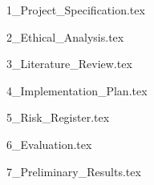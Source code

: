 \documentclass[a4paper, 11pt]{article}
\begin{document}


\tableofcontents

{1_Project_Specification.tex}

{2_Ethical_Analysis.tex}

{3_Literature_Review.tex}

{4_Implementation_Plan.tex}

{5_Risk_Register.tex}

{6_Evaluation.tex}

{7_Preliminary_Results.tex}


\newpage
\printbibliography

\end{document}
